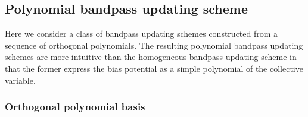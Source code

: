 \documentclass[reprint, superscriptaddress, floatfix]{revtex4-1}
\begin{document}
\subsection{\label{sec:bandpass_poly}
Polynomial bandpass updating scheme}


Here we consider a class of bandpass updating schemes
constructed from a sequence of orthogonal polynomials.
%
The resulting polynomial bandpass updating schemes are more intuitive
than the homogeneous bandpass updating scheme
in that the former express the bias potential as
a simple polynomial of the collective variable.

\subsubsection{Orthogonal polynomial basis}
\end{document}
